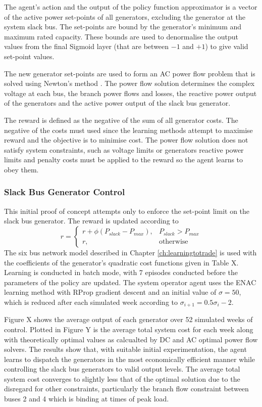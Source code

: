 The agent's action and the output of the policy function approximator is a
vector of the active power set-points of all generators, excluding the
generator at the system slack bus.  The set-points are bound by the generator's minimum
and maximum rated capacity. These bounds are used to denormalise the output
values from the final Sigmoid layer (that are between $-1$ and $+1$) to give
valid set-point values.

The new generator set-points are used to form an AC power flow problem that is
solved using Newton's method \cite{tinney:67}.  The power flow solution
determines the complex voltage at each bus, the branch power flows and losses,
the reactive power output of the generators and the active power output of the
slack bus generator.

The reward is defined as the negative of the sum of all generator costs.  The
negative of the costs must used since the learning methods attempt to maximise
reward and the objective is to minimise cost.  The power flow solution does not
satisfy system constraints, such as voltage limits or generators reactive power
limits and penalty costs must be applied to the reward so the agent learns to
obey them.

\subsubsection{Slack Bus Generator Control}
This initial proof of concept attempts only to enforce the set-point limit on
the slack bus generator.  The reward is updated according to
\begin{equation}
r =
\begin{cases}
r + \phi (P_{slack} - P_{max}), & \text{$P_{slack} > P_{max}$} \\
r, & \text{otherwise}
\end{cases}
\end{equation}
The six bus network model described in Chapter \ref{ch:learningtotrade} is used
with the coefficients of the generator's quadratic cost functions given in Table X.  Learning is conducted in batch
mode, with 7 episodes conducted before the parameters of the policy are
updated.  The system operator agent uses the ENAC learning method with RProp
gradient descent and an initial value of $\sigma = 50$, which is reduced after
each simulated week according to $\sigma_{i+1} = 0.5\sigma_i - 2$.

Figure X shows the average output of each generator over 52 simulated weeks of
control. Plotted in Figure Y is the average total system cost for each week along with
theoretically optimal values as calcualted by DC and AC optimal power flow
solvers.  The results show that, with suitable initial experimentation, the
agent learns to dispatch the generators in the most economically efficient
manner while controlling the slack bus generators to valid output levels.  The
average total system cost converges to slightly less that of the optimal
solution due to the disregard for other constraints, particularly the
branch flow constraint between buses 2 and 4 which is binding at times of peak
load.

